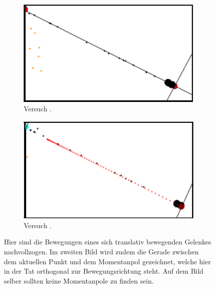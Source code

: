 \begin{figure}
    \centering
    \begin{subfigure}[t]{0.45\textwidth}
        \includegraphics[width=\textwidth]{gfx/translatives_glied_1.png}
        \caption{Versuch .}\label{fig:translatives_glied_1}
    \end{subfigure}
    \begin{subfigure}[t]{0.45\textwidth}
        \includegraphics[width=\textwidth]{gfx/translatives_glied_3.png}
        \caption{Versuch .}\label{fig:translatives_glied_3}
    \end{subfigure}
    \caption[Versuche  und ]{Hier sind die Bewegungen eines sich translativ bewegenden Gelenkes nachvollzogen. Im zweiten Bild wird zudem die Gerade zwischen dem aktuellen Punkt und dem Momentanpol gezeichnet, welche hier in der Tat orthogonal zur Bewegungsrichtung steht. Auf dem Bild selber sollten keine Momentanpole zu finden sein.}
    \label{fig:translatives_glied_1_3}
\end{figure}


